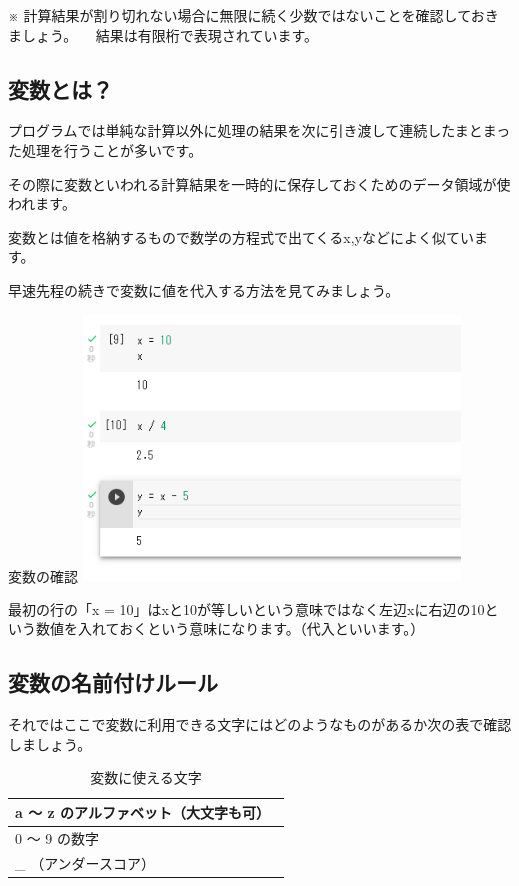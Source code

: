 \documentclass[11pt,a4paper,dvipdfmx,titlepage]{jsreport}
\begin{document}
※ 計算結果が割り切れない場合に無限に続く少数ではないことを確認しておきましょう。
　結果は有限桁で表現されています。

\subsection{変数とは？}

プログラムでは単純な計算以外に処理の結果を次に引き渡して連続したまとまった処理を行うことが多いです。

その際に変数といわれる計算結果を一時的に保存しておくためのデータ領域が使われます。

 変数とは値を格納するもので数学の方程式で出てくるx,yなどによく似ています。

早速先程の続きで変数に値を代入する方法を見てみましょう。

\begin{grabox}{変数の確認}
\includegraphics[width=10cm]{images/colab07.png}
\end{grabox}
最初の行の「x = 10」はxと10が等しいという意味ではなく左辺xに右辺の10という数値を入れておくという意味になります。（代入といいます。）

\subsection{変数の名前付けルール}
それではここで変数に利用できる文字にはどのようなものがあるか次の表で確認しましょう。

\begin{table}[h]
 \begin{center}
    \caption{変数に使える文字}
\begin{tabular}{|p{10cm}|} \hline
a ～ z のアルファベット（大文字も可）　\\ \hline
0 〜 9 の数字 \\ \hline
\_ （アンダースコア） \\ \hline
\end{tabular}
\end{center}
\end{table}
\end{document}

